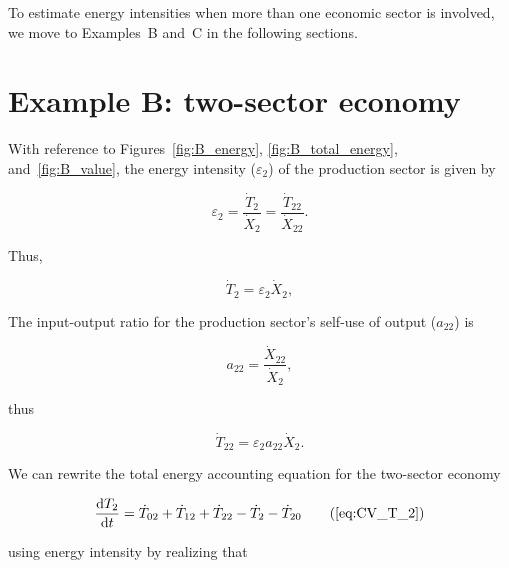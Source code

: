 To estimate energy intensities
when more than one economic sector is involved, 
we move to Examples~B and~C in the following sections.


\section{Example B: two-sector economy} %

With reference to Figures~\ref{fig:B_energy}, 
\ref{fig:B_total_energy},
and~\ref{fig:B_value}, 
the energy intensity ($\varepsilon_{2}$) 
of the production sector is given by

\begin{equation} \label{eq:single_sector_energy_intensity}
	\varepsilon_{2} 
	= \frac{\dot{T}_{2}}{\dot{X}_{2}} 
	= \frac{\dot{T}_{22}}{\dot{X}_{22}}.
\end{equation}

\noindent{}Thus,

\begin{equation} \label{eq:T_dot_1_single_sector}
	\dot{T}_{2} = \varepsilon_{2}\dot{X}_{2},
\end{equation}

The input-output ratio 
for the production sector's self-use of output ($a_{22}$) is

\begin{equation} \label{eq:io_ratio_single_sector}
	a_{22} = \frac{\dot{X}_{22}}{\dot{X}_{2}},
\end{equation}

\noindent{}thus

\begin{equation} \label{eq:T_dot_11_single_sector}
	\dot{T}_{22} = \varepsilon_{2}a_{22}\dot{X}_{2}.
\end{equation}

We can rewrite the total energy accounting equation 
for the two-sector economy

\begin{equation}
	\frac{\mathrm{d}T_{2}}{\mathrm{d}t} 	 
	= \dot{T}_{02} 
	+ \dot{T}_{12}
	+ \dot{T}_{22} 
	- \dot{T}_{2} 
	- \dot{T}_{20} \tag{\ref{eq:CV_T_2}}
\end{equation}

\noindent{}using energy intensity by realizing that 

